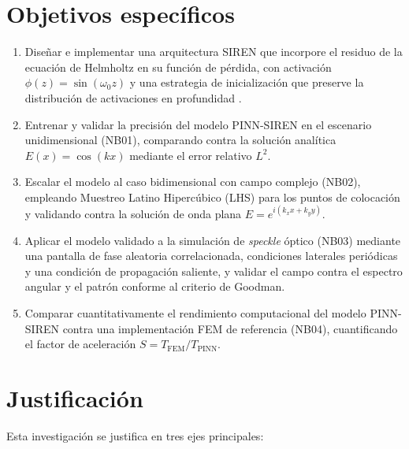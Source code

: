 \section{Objetivos específicos}

\begin{enumerate}
    \item Diseñar e implementar una arquitectura SIREN que incorpore el residuo
    de la ecuación de Helmholtz en su función de pérdida, con activación
    $\phi(z) = \sin(\omega_0 z)$ y una estrategia de inicialización que preserve
    la distribución de activaciones en profundidad \parencite{sitzmann2020siren}.

    \item Entrenar y validar la precisión del modelo PINN-SIREN en el escenario
    unidimensional (NB01), comparando contra la solución analítica
    $E(x) = \cos(kx)$ mediante el error relativo $L^2$.

    \item Escalar el modelo al caso bidimensional con campo complejo (NB02),
    empleando Muestreo Latino Hipercúbico (LHS) para los puntos de colocación y
    validando contra la solución de onda plana $E = e^{i(k_x x + k_y y)}$.

    \item Aplicar el modelo validado a la simulación de \textit{speckle} óptico
    (NB03) mediante una pantalla de fase aleatoria correlacionada, condiciones
    laterales periódicas y una condición de propagación saliente, y validar el
    campo contra el espectro angular y el patrón conforme al criterio de Goodman.

    \item Comparar cuantitativamente el rendimiento computacional del modelo
    PINN-SIREN contra una implementación FEM de referencia (NB04), cuantificando
    el factor de aceleración $S = T_\text{FEM} / T_\text{PINN}$.
\end{enumerate}

\section{Justificación}

Esta investigación se justifica en tres ejes principales:

